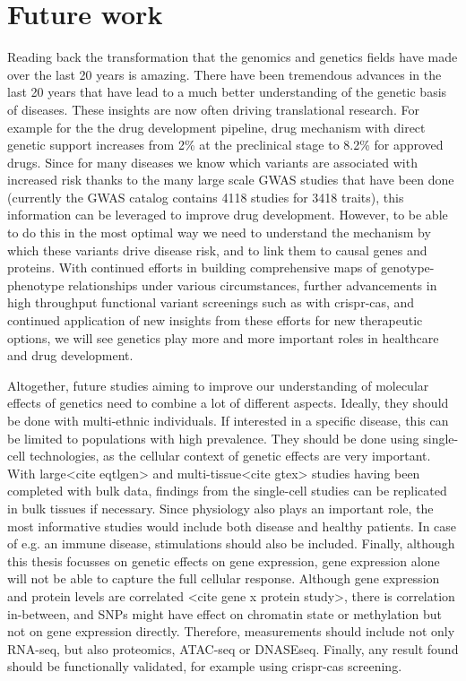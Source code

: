 \section{Future work}
Reading back the transformation that the genomics and genetics fields have made over the last 20 years is amazing. There have been tremendous advances in the last 20 years that have lead to a much better understanding of the genetic basis of diseases. These insights are now often driving translational research. For example for the the drug development pipeline, drug mechanism with direct genetic support increases from 2\% at the preclinical stage to 8.2\% for approved drugs\cite{nelsonSupportHumanGenetic2015d}. Since for many diseases we know which variants are associated with increased risk thanks to the many large scale GWAS studies that have been done (currently the GWAS catalog\cite{macarthurNewNHGRIEBICatalog2017a} contains 4118 studies for 3418 traits), this information can be leveraged to improve drug development. However, to be able to do this in the most optimal way we need to understand the mechanism by which these variants drive disease risk, and to link them to causal genes and proteins.
With continued efforts in building comprehensive maps of genotype-phenotype relationships under various circumstances, further advancements in high throughput functional variant screenings such as with crispr-cas, and continued application of new insights from these efforts for new therapeutic options, we will see genetics play more and more important roles in healthcare and drug development. 

Altogether, future studies aiming to improve our understanding of molecular effects of genetics need to combine a lot of different aspects. Ideally, they should be done with multi-ethnic individuals. If interested in a specific disease, this can be limited to populations with high prevalence. They should be done using single-cell technologies, as the cellular context of genetic effects are very important. With large<cite eqtlgen> and multi-tissue<cite gtex> studies having been completed with bulk data, findings from the single-cell studies can be replicated in bulk tissues if necessary. Since physiology also plays an important role, the most informative studies would include both disease and healthy patients. In case of e.g. an immune disease, stimulations should also be included. Finally, although this thesis focusses on genetic effects on gene expression, gene expression alone will not be able to capture the full cellular response. Although gene expression and protein levels are correlated <cite gene x protein study>, there is correlation in-between, and SNPs might have effect on chromatin state or methylation but not on gene expression directly. Therefore, measurements should include not only RNA-seq, but also proteomics, ATAC-seq or DNASEseq. Finally, any result found should be functionally validated, for example using crispr-cas screening.


